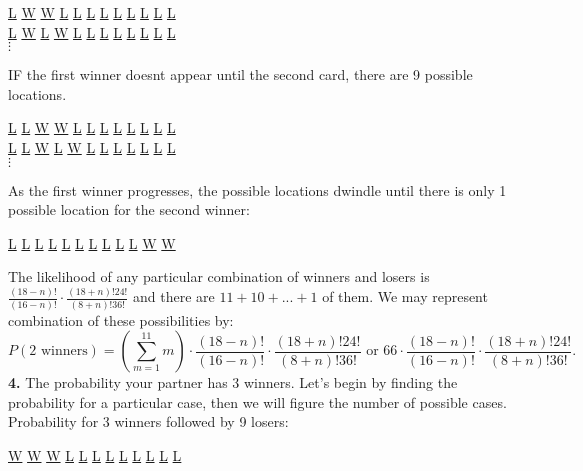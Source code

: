 \documentclass[11pt]{article}
\begin{document}
\begin {center}
  \underline{L} \underline{W} \underline{W} \underline{L} \underline{L} \underline{L} \underline{L} \underline{L} \underline{L} \underline{L} \underline{L} \underline{L}\\
\underline{L} \underline{W} \underline{L} \underline{W} \underline{L} \underline{L} \underline{L} \underline{L} \underline{L} \underline{L} \underline{L} \underline{L}\\
$\vdots$
  \end{center}
IF the first winner doesnt appear until the second card, there are 9 possible locations.
\begin {center}
  \underline{L} \underline{L} \underline{W} \underline{W} \underline{L} \underline{L} \underline{L} \underline{L} \underline{L} \underline{L} \underline{L} \underline{L}\\
\underline{L} \underline{L} \underline{W} \underline{L} \underline{W} \underline{L} \underline{L} \underline{L} \underline{L} \underline{L} \underline{L} \underline{L}\\
$\vdots$
  \end{center}
As the first winner progresses, the possible locations dwindle until there is only 1 possible location for the second winner:
\begin {center}
  \underline{L} \underline{L} \underline{L} \underline{L} \underline{L} \underline{L} \underline{L} \underline{L} \underline{L} \underline{L} \underline{W} \underline{W}\\
  \end{center}
The likelihood of any particular combination of winners and losers is $\frac{(18-n)!}{(16-n)!}\cdot \frac{(18+n)!24!}{(8+n)!36!}$ and there are $11+10+...+1$ of them. We may represent combination of these possibilities by:
\begin{equation}
P(2\text{ winners})= \left( \displaystyle\sum_{m=1}^{11} m \right) \cdot \frac{(18-n)!}{(16-n)!}\cdot \frac{(18+n)!24!}{(8+n)!36!} \text{ or } 66 \cdot \frac{(18-n)!}{(16-n)!}\cdot \frac{(18+n)!24!}{(8+n)!36!}.
\end{equation}
\indent \textbf{4.} The probability your partner has 3 winners. Let's begin by finding the probability for a particular case, then we will figure the number of possible cases. Probability for 3 winners followed by 9 losers:
\begin {center}
  \underline{W} \underline{W} \underline{W} \underline{L} \underline{L} \underline{L} \underline{L} \underline{L} \underline{L} \underline{L} \underline{L} \underline{L}\\
  \end{center}
\end{document}
